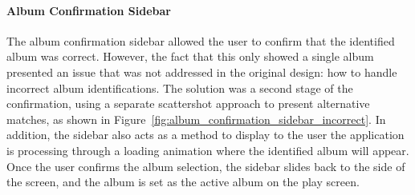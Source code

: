 \paragraph{Album Confirmation Sidebar}
The album confirmation sidebar allowed the user to confirm that the identified album was correct. However, the fact that this only showed a single album presented an issue that was not addressed in the original design: how to handle incorrect album identifications. The solution was a second stage of the confirmation, using a separate scattershot approach to present alternative matches, as shown in Figure~\ref{fig:album_confirmation_sidebar_incorrect}. In addition, the sidebar also acts as a method to display to the user the application is processing through a loading animation where the identified album will appear. Once the user confirms the album selection, the sidebar slides back to the side of the screen, and the album is set as the active album on the play screen.

